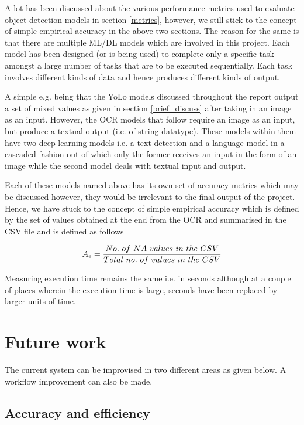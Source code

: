 A lot has been discussed about the various performance metrics used to evaluate object detection models in section \ref{metrics}, however, we still stick to the concept of simple empirical accuracy in the above two sections. The reason for the same is that there are multiple ML/DL models which are involved in this project. Each model has been designed (or is being used) to complete only a specific task amongst a large number of tasks that are to be executed sequentially. Each task involves different kinds of data and hence produces different kinds of output. \par

A simple e.g. being that the YoLo models discussed throughout the report output a set of mixed values as given in section \ref{brief_discuss} after taking in an image as an input. However, the OCR models that follow require an image as an input, but produce a textual output (i.e. of string datatype). These models within them have two deep learning models i.e. a text detection and a language model in a cascaded fashion out of which only the former receives an input in the form of an image while the second model deals with textual input and output. \par

Each of these models named above has its own set of accuracy metrics which may be discussed however, they would be irrelevant to the final output of the project. Hence, we have stuck to the concept of simple empirical accuracy which is defined by the set of values obtained at the end from the OCR and summarised in the CSV file and is defined as follows

\begin{equation}
\centering
A_{e} = \frac{No. \ of  \ NA \ values \ in \ the \ CSV}{Total \ no. \ of \ values \ in \ the \ CSV }

\end{equation}

Measuring execution time remains the same i.e. in seconds although at a couple of places wherein the execution time is large, seconds have been replaced by larger units of time.
\section{Future work}

The current system can be improvised in two different areas as given below. A workflow improvement can also be made.

\subsection{Accuracy and efficiency}

